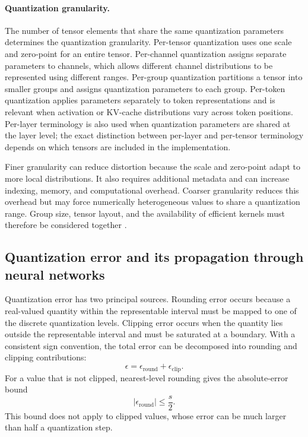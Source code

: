 \paragraph{Quantization granularity.}
The number of tensor elements that share the same quantization
parameters determines the quantization granularity. Per-tensor
quantization uses one scale and zero-point for an entire tensor.
Per-channel quantization assigns separate parameters to channels, which
allows different channel distributions to be represented using different
ranges. Per-group quantization partitions a tensor into smaller groups
and assigns quantization parameters to each group. Per-token
quantization applies parameters separately to token representations and
is relevant when activation or KV-cache distributions vary across token
positions. Per-layer terminology is also used when quantization
parameters are shared at the layer level; the exact distinction between
per-layer and per-tensor terminology depends on which tensors are
included in the implementation.

Finer granularity can reduce distortion because the scale and zero-point
adapt to more local distributions. It also requires additional metadata
and can increase indexing, memory, and computational overhead. Coarser
granularity reduces this overhead but may force numerically heterogeneous
values to share a quantization range. Group size, tensor layout, and the
availability of efficient kernels must therefore be considered together
\parencite{song2026targetcentricqat,chen2026llmquantization}.

\subsection{Quantization error and its propagation through neural networks}
\label{subsec:quant-error-propagation}

Quantization error has two principal sources. Rounding error occurs
because a real-valued quantity within the representable interval must
be mapped to one of the discrete quantization levels. Clipping error
occurs when the quantity lies outside the representable interval and
must be saturated at a boundary. With a consistent sign convention,
the total error can be decomposed into rounding and clipping
contributions:
\begin{equation}
    \epsilon=\epsilon_{\mathrm{round}}
              +\epsilon_{\mathrm{clip}}.
    \label{eq:quant-error-decomposition}
\end{equation}
For a value that is not clipped, nearest-level rounding gives the
absolute-error bound
\begin{equation}
    |\epsilon_{\mathrm{round}}|
    \leq \frac{s}{2}.
    \label{eq:quant-rounding-bound}
\end{equation}
This bound does not apply to clipped values, whose error can be much
larger than half a quantization step.

